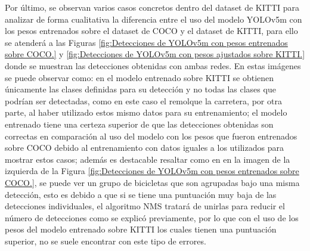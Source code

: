 Por último, se observan varios casos concretos dentro del dataset de KITTI para analizar de forma cualitativa la diferencia entre el uso del modelo YOLOv5m con los pesos entrenados sobre el dataset de COCO y el dataset de KITTI, para ello se atenderá a las Figuras \ref{fig:Detecciones de YOLOv5m con pesos entrenados sobre COCO.} y \ref{fig:Detecciones de YOLOv5m con pesos ajustados sobre KITTI.} donde se muestran las detecciones obtenidas con ambas redes. En estas imágenes se puede observar como: en el modelo entrenado sobre KITTI se obtienen únicamente las clases definidas para su detección y no todas las clases que podrían ser detectadas, como en este caso el remolque la carretera, por otra parte, al haber utilizado estos mismo datos para su entrenamiento; el modelo entrenado tiene una certeza superior de que las detecciones obtenidas son correctas en comparación al uso del modelo con los pesos que fueron entrenados sobre COCO debido al entrenamiento con datos iguales a los utilizados para mostrar estos casos; además es destacable resaltar como en en la imagen de la izquierda de la Figura \ref{fig:Detecciones de YOLOv5m con pesos entrenados sobre COCO.}, se puede ver un grupo de bicicletas que son agrupadas bajo una misma detección, esto es debido a que si se tiene una puntuación muy baja de las detecciones individuales, el algoritmo \ac{NMS} tratará de unirlas para reducir el número de detecciones como se explicó previamente, por lo que con el uso de los pesos del modelo entrenado sobre KITTI los cuales tienen una puntuación superior, no se suele encontrar con este tipo de errores.